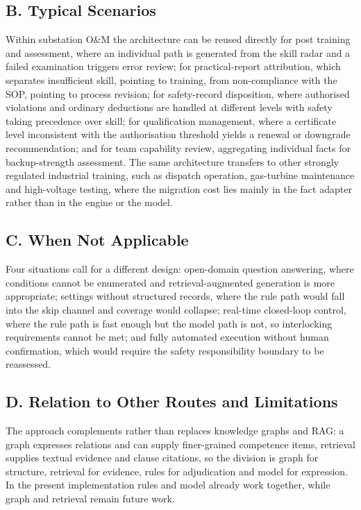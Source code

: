 \documentclass[conference]{IEEEtran}
\begin{document}
\subsection{B. Typical Scenarios}

Within substation O\&M the architecture can be reused directly for post training and assessment, where an individual path is generated from the skill radar and a failed examination triggers error review; for practical-report attribution, which separates insufficient skill, pointing to training, from non-compliance with the SOP, pointing to process revision; for safety-record disposition, where authorised violations and ordinary deductions are handled at different levels with safety taking precedence over skill; for qualification management, where a certificate level inconsistent with the authorisation threshold yields a renewal or downgrade recommendation; and for team capability review, aggregating individual facts for backup-strength assessment. The same architecture transfers to other strongly regulated industrial training, such as dispatch operation, gas-turbine maintenance and high-voltage testing, where the migration cost lies mainly in the fact adapter rather than in the engine or the model.


\subsection{C. When Not Applicable}

Four situations call for a different design: open-domain question answering, where conditions cannot be enumerated and retrieval-augmented generation is more appropriate; settings without structured records, where the rule path would fall into the skip channel and coverage would collapse; real-time closed-loop control, where the rule path is fast enough but the model path is not, so interlocking requirements cannot be met; and fully automated execution without human confirmation, which would require the safety responsibility boundary to be reassessed.


\subsection{D. Relation to Other Routes and Limitations}

The approach complements rather than replaces knowledge graphs and RAG: a graph expresses relations and can supply finer-grained competence items, retrieval supplies textual evidence and clause citations, so the division is graph for structure, retrieval for evidence, rules for adjudication and model for expression. In the present implementation rules and model already work together, while graph and retrieval remain future work.
\end{document}
